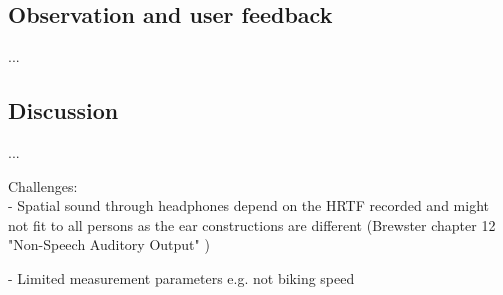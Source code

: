 \subsection{Observation and user feedback}
...

\subsection{Discussion}
...





Challenges:\\
- Spatial sound through headphones depend on the HRTF recorded and might not fit to all persons as the ear constructions are different (Brewster chapter 12 "Non-Speech Auditory Output" \cite{brewster_human-computer_2003})



- Limited measurement parameters e.g. not biking speed








